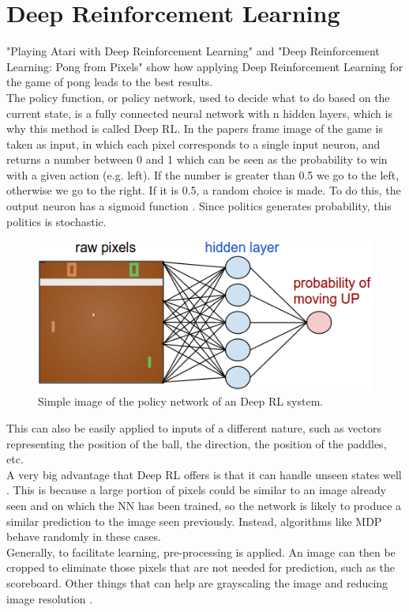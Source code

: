 \section{Deep Reinforcement Learning}

"Playing Atari with Deep Reinforcement Learning" \cite{mnih2013playing} and "Deep Reinforcement Learning: Pong from Pixels" \cite{karpathy2016deep} show how applying Deep Reinforcement Learning for the game of pong leads to the best results.\\

The policy function, or policy network, used to decide what to do based on the current state, is a fully connected neural network with n hidden layers, which is why this method is called Deep RL. In the papers frame image of the game is taken as input, in which each pixel corresponds to a single input neuron, and returns a number between 0 and 1 which can be seen as the probability to win with a given action (e.g. left). If the number is greater than 0.5 we go to the left, otherwise we go to the right. If it is 0.5, a random choice is made. To do this, the output neuron has a sigmoid function \cite{mnih2013playing}\cite{karpathy2016deep}.
Since politics generates probability, this politics is stochastic.

\begin{figure}[ht]
    \centering
    \includegraphics[scale=0.4]{images/DRL_network.png}
    \caption{Simple image of the policy network of an Deep RL system.}
    \label{fig:DRL_network}
\end{figure}

This can also be easily applied to inputs of a different nature, such as vectors representing the position of the ball, the direction, the position of the paddles, etc. \\

A very big advantage that Deep RL offers is that it can handle unseen states well \cite{mnih2013playing}\cite{karpathy2016deep}. This is because a large portion of pixels could be similar to an image already seen and on which the NN has been trained, so the network is likely to produce a similar prediction to the image seen previously. Instead, algorithms like MDP behave randomly in these cases. \\

Generally, to facilitate learning, pre-processing is applied.
An image can then be cropped to eliminate those pixels that are not needed for prediction, such as the scoreboard. Other things that can help are grayscaling the image and reducing image resolution \cite{mnih2013playing}.